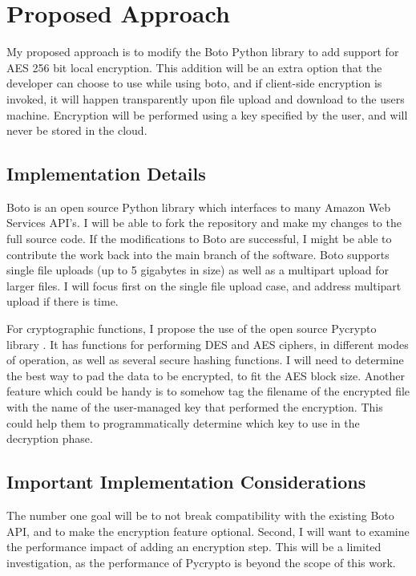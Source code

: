 \section{Proposed Approach}

My proposed approach is to modify the Boto Python library to add support for AES 256 bit local encryption. 
This addition will be an extra option that the developer can choose to use while using boto, and if client-side encryption
is invoked, it will happen transparently upon file upload and download to the users machine. Encryption will be performed
using a key specified by the user, and will never be stored in the cloud.

\subsection{Implementation Details}

Boto is an open source Python library which interfaces to many Amazon Web Services API's. I will be able to fork the repository and make my changes to the full source code.
If the modifications to Boto are successful, I might be able to contribute the work back into the main branch of the software.
Boto supports single file uploads (up to 5 gigabytes in size) as well as a multipart upload for larger files. I will focus first on the single file upload case, and address multipart upload if there is time.

For cryptographic functions, I propose the use of the open source Pycrypto library \cite{pycrypto}. It has functions for performing DES and AES ciphers, in different modes of operation, as well as several secure hashing functions.
I will need to determine the best way to pad the data to be encrypted, to fit the AES block size. Another feature which could be handy is to somehow tag the filename of the encrypted file with the name of the user-managed key that performed the encryption. This could help them to programmatically determine which key to use in the decryption phase.

\subsection{Important Implementation Considerations}
The number one goal will be to not break compatibility with the existing Boto API, and to make the encryption feature optional. Second, I will want to examine the performance impact of adding an encryption step.
This will be a limited investigation, as the performance of Pycrypto is beyond the scope of this work.

